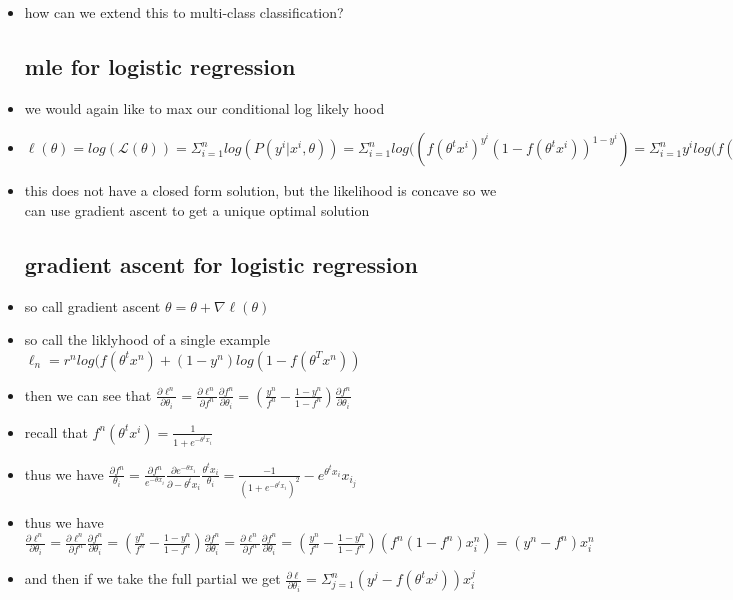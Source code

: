 \documentclass{article}
\begin{document}
\begin{itemize}
\begin{itemize}
    \item so in other words the log odds are a linear function that form a decision boundary, that is a linear decision boundary
    \item this means the decision boundary is linear, ie the features are linear in the parameter as we increase the value of $\theta^tx$ we get 1, and as we decrees it we get zero
\end{itemize}
\item how can we extend this to multi-class classification?
\subsection{mle for logistic regression}
\item we would again like to max our conditional log likely hood
\item $\ell(\theta)=log(\mathcal{L}(\theta))=\Sigma_{i=1}^{n}log (P(y^i|x^i,\theta))=\Sigma_{i=1}^{n}log((f(\theta^t x^i)^y^i(1-f(\theta^t x^i))^{1-y^i})=\Sigma_{i=1}^{n}y^ilog(f(\theta^t x^i)+({1-y^i})log(1-f(\theta^t x^i))$
\item this does not have a closed form solution, but the likelihood is concave so we can use gradient ascent to get a unique optimal solution 
\subsection{gradient ascent for logistic regression}
\item so call gradient ascent $\theta=\theta+\nabla \ell(\theta)$
\item so call the liklyhood of a single example $\ell_n=r^nlog(f(\theta^tx^n)+(1-y^n)log(1-f(\theta^Tx^n))$
\item then we can see that $\frac{\partial \ell^n}{\partial \theta_i}=\frac{\partial \ell^n}{\partial f^n}\frac{\partial f^n}{\partial \theta_i}=(\frac{y^n}{f^n}-\frac{1-y^n}{1-f^n})\frac{\partial f^n}{\partial \theta_i}$
\item recall that $f^n(\theta^t x^i)=\frac{1}{1+e^{-\theta^t x_i}}$ 
\item thus we have $\frac{\partial f^n}{\theta_i}=\frac{\partial f^n}{e^{-\theta x_i}}\frac{\partial e^{-\theta x_i}}{\partial -\theta^tx_i}\frac{\theta^tx_i}{\theta_i}=\frac{-1}{(1+e^{-\theta^tx_i})^2}-e^{\theta^t x_i}x_i_j$
\item thus we have $\frac{\partial \ell^n}{\partial \theta_i}=\frac{\partial \ell^n}{\partial f^n}\frac{\partial f^n}{\partial \theta_i}=(\frac{y^n}{f^n}-\frac{1-y^n}{1-f^n})\frac{\partial f^n}{\partial \theta_i}=\frac{\partial \ell^n}{\partial f^n}\frac{\partial f^n}{\partial \theta_i}=(\frac{y^n}{f^n}-\frac{1-y^n}{1-f^n})(f^n(1-f^n)x_i^n)=(y^n-f^n)x_i^n$
\item and then if we take the full partial we get $\frac{\partial \ell}{\partial \theta_i}=\Sigma_{j=1}^{n}(y^j-f(\theta^tx^j))x^j_i$

\end{itemize}
\end{document}
